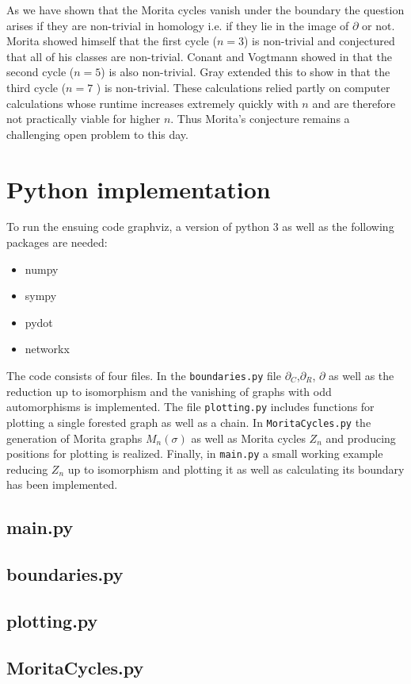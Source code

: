 As we have shown that the Morita cycles vanish under the boundary the question arises if they are
non-trivial in homology i.e. if they lie in the image of $\partial$ or not. 
Morita showed himself that the first cycle ($n=3$) is non-trivial and conjectured that 
all of his classes are non-trivial. Conant and Vogtmann showed in \cite{conant04} that 
the second cycle ($n=5$) is also non-trivial. Gray extended this
to show in \cite{gray11} that the third cycle ($n=7$ ) is non-trivial.
These calculations relied partly on computer calculations
whose runtime increases extremely quickly with $n$ and are therefore not practically viable for higher $n$. Thus Morita's conjecture
remains a challenging open problem to this day.

\newpage
\printbibliography
\newpage
\appendix
\section{Python implementation}
To run the ensuing code graphviz, a version of python 3 as well as the following packages are needed:
\begin{itemize}
	\item numpy
	\item sympy
	\item pydot
	\item networkx
\end{itemize}
The code consists of four files.
In the \texttt{boundaries.py} file $\partial_{C}$,$\partial_{R}$, $\partial$ as well as
the reduction up to isomorphism and the vanishing of graphs with odd automorphisms is implemented.
The file \texttt{plotting.py} includes functions for plotting a single forested graph as well as a chain.
In \texttt{MoritaCycles.py} the generation of Morita graphs $M_{n}(\sigma)$ as well as
Morita cycles $Z_{n}$ and producing positions for plotting is realized.
Finally, in \texttt{main.py} a small working example reducing $Z_{n}$ up to isomorphism and plotting it as well as calculating
its boundary has been implemented.

\subsection{main.py}

\subsection{boundaries.py}

\subsection{plotting.py}

\subsection{MoritaCycles.py}


%


